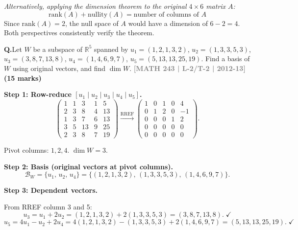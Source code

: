 \documentclass[12pt,a3paper]{article}
\newcommand{\yr}[1]{\hfill\textcolor{gray}{\small\textbf{[#1]}}}
\newcommand{\mk}[1]{\textcolor{orange!70!black}{\small\textbf{(#1 marks)}}}
\newcounter{qnum}
\newcommand{\Q}[1]{%
  \needspace{4\baselineskip}
  \refstepcounter{qnum}
  \vspace{6pt}
  \noindent\textbf{Q\theqnum.}\enspace #1\par
}
\begin{document}
\begin{tcolorbox}
\textit{Alternatively, applying the dimension theorem to the original $4 \times 6$ matrix $A$:}
\[
  \mathrm{rank}(A) + \mathrm{nullity}(A) = \text{number of columns of } A
\]
Since $\mathrm{rank}(A) = 2$, the null space of $A$ would have a dimension of $6 - 2 = 4$. Both perspectives consistently verify the theorem.

\end{tcolorbox}

\Q{Let $W$ be a subspace of $\mathbb{R}^5$ spanned by $u_1 = (1,2,1,3,2)$, $u_2 = (1,3,3,5,3)$, $u_3 = (3,8,7,13,8)$, $u_4 = (1,4,6,9,7)$, $u_5 = (5,13,13,25,19)$. Find a basis of $W$ using original vectors, and find $\dim W$.
\yr{MATH 243 | L-2/T-2 | 2012-13} \mk{15}}

\begin{tcolorbox}[enhanced,breakable,
  colback=cC!4,colframe=cC,boxrule=0.8pt,arc=5pt,
  title={\textbf{Answer --- Basis and Dimension of $W = \mathrm{span}\{u_1,\dots,u_5\}$}},
  fonttitle=\bfseries\color{white},colbacktitle=cC]

\textbf{Step 1: Row-reduce $[u_1\mid u_2\mid u_3\mid u_4\mid u_5]$.}
\[
\begin{pmatrix}
1 & 1 &  3 & 1 &  5 \\
2 & 3 &  8 & 4 & 13 \\
1 & 3 &  7 & 6 & 13 \\
3 & 5 & 13 & 9 & 25 \\
2 & 3 &  8 & 7 & 19
\end{pmatrix}
\xrightarrow{\text{RREF}}
\begin{pmatrix}
1 & 0 & 1 & 0 &  4 \\
0 & 1 & 2 & 0 & -1 \\
0 & 0 & 0 & 1 &  2 \\
0 & 0 & 0 & 0 &  0 \\
0 & 0 & 0 & 0 &  0
\end{pmatrix}.
\]

Pivot columns: $1, 2, 4$. \quad $\dim W = 3$.

\medskip
\textbf{Step 2: Basis (original vectors at pivot columns).}
\[
\boxed{\mathcal{B}_W = \{u_1,\, u_2,\, u_4\} = \{(1,2,1,3,2),\,(1,3,3,5,3),\,(1,4,6,9,7)\}}.
\]

\textbf{Step 3: Dependent vectors.}

From RREF column 3 and 5:
\[
u_3 = u_1 + 2u_2 = (1,2,1,3,2)+2(1,3,3,5,3) = (3,8,7,13,8).\;\checkmark
\]
\[
u_5 = 4u_1 - u_2 + 2u_4 = 4(1,2,1,3,2)-(1,3,3,5,3)+2(1,4,6,9,7) = (5,13,13,25,19).\;\checkmark
\]

\end{tcolorbox}
\end{document}
